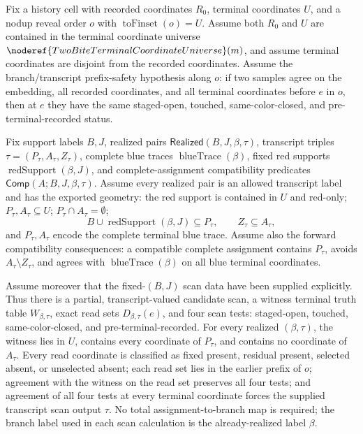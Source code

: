 \begin{helper}
Fix a history cell with recorded coordinates \(R_0\), terminal coordinates
\(U\), and a nodup reveal order \(o\) with \(\operatorname{toFinset}(o)=U\).
Assume both \(R_0\) and \(U\) are contained in the terminal coordinate
universe \(\noderef{TwoBiteTerminalCoordinateUniverse}(m)\), and assume
terminal coordinates are disjoint from the recorded coordinates.
Assume the branch/transcript prefix-safety hypothesis along \(o\): if two
samples agree on the embedding, all recorded coordinates, and all terminal
coordinates before \(e\) in \(o\), then at \(e\) they have the same
staged-open, touched, same-color-closed, and pre-terminal-recorded status.

Fix support labels \(B,J\), realized pairs
\(\mathsf{Realized}(B,J,\beta,\tau)\), transcript triples
\(\tau=(P_\tau,A_\tau,Z_\tau)\), complete blue traces
\(\operatorname{blueTrace}(\beta)\), fixed red supports
\(\operatorname{redSupport}(\beta,J)\), and complete-assignment
compatibility predicates \(\mathsf{Comp}(A;B,J,\beta,\tau)\).  Assume every
realized pair is an allowed transcript label and has the exported geometry:
the red support is contained in \(U\) and red-only; \(P_\tau,A_\tau\subseteq U\);
\(P_\tau\cap A_\tau=\emptyset\);
\[
B\cup\operatorname{redSupport}(\beta,J)\subseteq P_\tau,\qquad
Z_\tau\subseteq A_\tau,
\]
and \(P_\tau,A_\tau\) encode the complete terminal blue trace.  Assume also
the forward compatibility consequences: a compatible complete assignment
contains \(P_\tau\), avoids \(A_\tau\setminus Z_\tau\), and agrees with
\(\operatorname{blueTrace}(\beta)\) on all blue terminal coordinates.

Assume moreover that the fixed-\((B,J)\) scan data have been supplied
explicitly.  Thus there is a partial, transcript-valued candidate scan, a
witness terminal truth table \(W_{\beta,\tau}\), exact read sets
\(D_{\beta,\tau}(e)\), and four scan tests: staged-open, touched,
same-color-closed, and pre-terminal-recorded.  For every realized
\((\beta,\tau)\), the witness lies in \(U\), contains every coordinate of
\(P_\tau\), and contains no coordinate of \(A_\tau\).  Every read coordinate
is classified as fixed present, residual present, selected absent, or
unselected absent; each read set lies in the earlier prefix of \(o\); agreement
with the witness on the read set preserves all four tests; and agreement of
all four tests at every terminal coordinate forces the supplied transcript
scan output \(\tau\).  No total assignment-to-branch map is required; the
branch label used in each scan calculation is the already-realized label
\(\beta\).


\end{helper}
